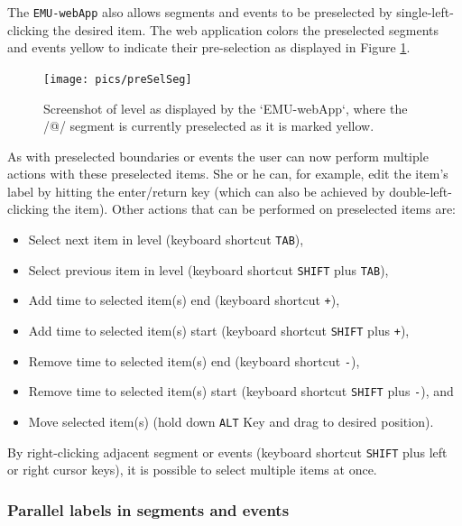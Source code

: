 \documentclass[]{book}
\providecommand{\tightlist}{%
  \setlength{\itemsep}{0pt}\setlength{\parskip}{0pt}}
\begin{document}
The \texttt{EMU-webApp} also allows segments and events to be preselected by single-left-clicking the desired item. The web application colors the preselected segments and events yellow to indicate their pre-selection as displayed in Figure \ref{fig:webApp-preSelSeg}.

\begin{figure}

{\centering \texttt{[image: pics/preSelSeg]} 

}

\caption{Screenshot of level as displayed by the `EMU-webApp`, where the /@/ segment is currently preselected as it is marked yellow.}\label{fig:webApp-preSelSeg}
\end{figure}

As with preselected boundaries or events the user can now perform multiple actions with these preselected items. She or he can, for example, edit the item's label by hitting the enter/return key (which can also be achieved by double-left-clicking the item). Other actions that can be performed on preselected items are:

\begin{itemize}
\tightlist
\item
  Select next item in level (keyboard shortcut \texttt{TAB}),
\item
  Select previous item in level (keyboard shortcut \texttt{SHIFT} plus \texttt{TAB}),
\item
  Add time to selected item(s) end (keyboard shortcut \texttt{+}),
\item
  Add time to selected item(s) start (keyboard shortcut \texttt{SHIFT} plus \texttt{+}),
\item
  Remove time to selected item(s) end (keyboard shortcut \texttt{-}),
\item
  Remove time to selected item(s) start (keyboard shortcut \texttt{SHIFT} plus \texttt{-}), and
\item
  Move selected item(s) (hold down \texttt{ALT} Key and drag to desired position).
\end{itemize}

By right-clicking adjacent segment or events (keyboard shortcut \texttt{SHIFT} plus left or right cursor keys), it is possible to select multiple items at once.

\hypertarget{parallel-labels-in-segments-and-events}{%
\subsubsection*{Parallel labels in segments and events}\label{parallel-labels-in-segments-and-events}}
\end{document}

